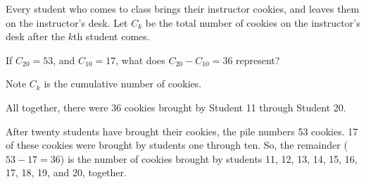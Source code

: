 \begin{Mquestion}\label{prob_s3.2:cookies2}
Every student who comes to class brings their instructor cookies, and leaves them on the instructor's desk. Let $C_k$ be the total number of cookies on the instructor's desk after the $k$th student comes.

If $C_{20}=53$, and $C_{10}=17$, what does $C_{20}-C_{10}=36$ represent?
\end{Mquestion}
\begin{hint}
Note $C_k$ is the cumulative number of cookies.
\end{hint}
\begin{answer}
All together, there were 36 cookies brought by Student 11 through Student 20.
\end{answer}
\begin{solution}
After twenty students have brought their cookies, the pile numbers 53 cookies. 17 of these cookies were brought by students one through ten. So, the remainder ($53-17=36$) is the number of cookies brought by students 11, 12, 13, 14, 15, 16, 17, 18, 19, and 20, together.

\begin{center}
\end{center}
\end{solution}

